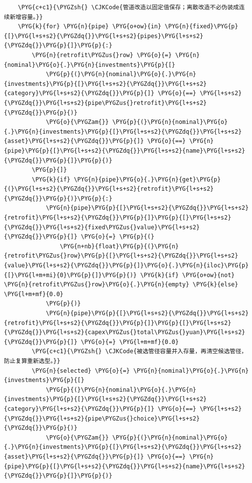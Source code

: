\begin{Verbatim}
    \PYG{c+c1}{\PYGZsh{} \CJKCode{管道改造以固定值保存；离散改造不必伪装成连续新增容量。}}
    \PYG{k}{for} \PYG{n}{pipe} \PYG{o+ow}{in} \PYG{n}{fixed}\PYG{p}{[}\PYG{l+s+s2}{\PYGZdq{}}\PYG{l+s+s2}{pipes}\PYG{l+s+s2}{\PYGZdq{}}\PYG{p}{]}\PYG{p}{:}
        \PYG{n}{retrofit\PYGZus{}row} \PYG{o}{=} \PYG{n}{nominal}\PYG{o}{.}\PYG{n}{investments}\PYG{p}{[}
            \PYG{p}{(}\PYG{n}{nominal}\PYG{o}{.}\PYG{n}{investments}\PYG{p}{[}\PYG{l+s+s2}{\PYGZdq{}}\PYG{l+s+s2}{category}\PYG{l+s+s2}{\PYGZdq{}}\PYG{p}{]} \PYG{o}{==} \PYG{l+s+s2}{\PYGZdq{}}\PYG{l+s+s2}{pipe\PYGZus{}retrofit}\PYG{l+s+s2}{\PYGZdq{}}\PYG{p}{)}
            \PYG{o}{\PYGZam{}} \PYG{p}{(}\PYG{n}{nominal}\PYG{o}{.}\PYG{n}{investments}\PYG{p}{[}\PYG{l+s+s2}{\PYGZdq{}}\PYG{l+s+s2}{asset}\PYG{l+s+s2}{\PYGZdq{}}\PYG{p}{]} \PYG{o}{==} \PYG{n}{pipe}\PYG{p}{[}\PYG{l+s+s2}{\PYGZdq{}}\PYG{l+s+s2}{name}\PYG{l+s+s2}{\PYGZdq{}}\PYG{p}{]}\PYG{p}{)}
        \PYG{p}{]}
        \PYG{k}{if} \PYG{n}{pipe}\PYG{o}{.}\PYG{n}{get}\PYG{p}{(}\PYG{l+s+s2}{\PYGZdq{}}\PYG{l+s+s2}{retrofit}\PYG{l+s+s2}{\PYGZdq{}}\PYG{p}{)}\PYG{p}{:}
            \PYG{n}{pipe}\PYG{p}{[}\PYG{l+s+s2}{\PYGZdq{}}\PYG{l+s+s2}{retrofit}\PYG{l+s+s2}{\PYGZdq{}}\PYG{p}{]}\PYG{p}{[}\PYG{l+s+s2}{\PYGZdq{}}\PYG{l+s+s2}{fixed\PYGZus{}value}\PYG{l+s+s2}{\PYGZdq{}}\PYG{p}{]} \PYG{o}{=} \PYG{p}{(}
                \PYG{n+nb}{float}\PYG{p}{(}\PYG{n}{retrofit\PYGZus{}row}\PYG{p}{[}\PYG{l+s+s2}{\PYGZdq{}}\PYG{l+s+s2}{value}\PYG{l+s+s2}{\PYGZdq{}}\PYG{p}{]}\PYG{o}{.}\PYG{n}{iloc}\PYG{p}{[}\PYG{l+m+mi}{0}\PYG{p}{]}\PYG{p}{)} \PYG{k}{if} \PYG{o+ow}{not} \PYG{n}{retrofit\PYGZus{}row}\PYG{o}{.}\PYG{n}{empty} \PYG{k}{else} \PYG{l+m+mf}{0.0}
            \PYG{p}{)}
            \PYG{n}{pipe}\PYG{p}{[}\PYG{l+s+s2}{\PYGZdq{}}\PYG{l+s+s2}{retrofit}\PYG{l+s+s2}{\PYGZdq{}}\PYG{p}{]}\PYG{p}{[}\PYG{l+s+s2}{\PYGZdq{}}\PYG{l+s+s2}{capex\PYGZus{}total\PYGZus{}yuan}\PYG{l+s+s2}{\PYGZdq{}}\PYG{p}{]} \PYG{o}{=} \PYG{l+m+mf}{0.0}
        \PYG{c+c1}{\PYGZsh{} \CJKCode{被选管径容量并入存量，再清空候选管径，防止复算重新选型。}}
        \PYG{n}{selected} \PYG{o}{=} \PYG{n}{nominal}\PYG{o}{.}\PYG{n}{investments}\PYG{p}{[}
            \PYG{p}{(}\PYG{n}{nominal}\PYG{o}{.}\PYG{n}{investments}\PYG{p}{[}\PYG{l+s+s2}{\PYGZdq{}}\PYG{l+s+s2}{category}\PYG{l+s+s2}{\PYGZdq{}}\PYG{p}{]} \PYG{o}{==} \PYG{l+s+s2}{\PYGZdq{}}\PYG{l+s+s2}{pipe\PYGZus{}choice}\PYG{l+s+s2}{\PYGZdq{}}\PYG{p}{)}
            \PYG{o}{\PYGZam{}} \PYG{p}{(}\PYG{n}{nominal}\PYG{o}{.}\PYG{n}{investments}\PYG{p}{[}\PYG{l+s+s2}{\PYGZdq{}}\PYG{l+s+s2}{asset}\PYG{l+s+s2}{\PYGZdq{}}\PYG{p}{]} \PYG{o}{==} \PYG{n}{pipe}\PYG{p}{[}\PYG{l+s+s2}{\PYGZdq{}}\PYG{l+s+s2}{name}\PYG{l+s+s2}{\PYGZdq{}}\PYG{p}{]}\PYG{p}{)}

\end{Verbatim}
